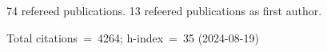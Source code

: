 74 refereed publications. 13 refeered publications as first author.

Total citations~=~4264; h-index~=~35 (2024-08-19)